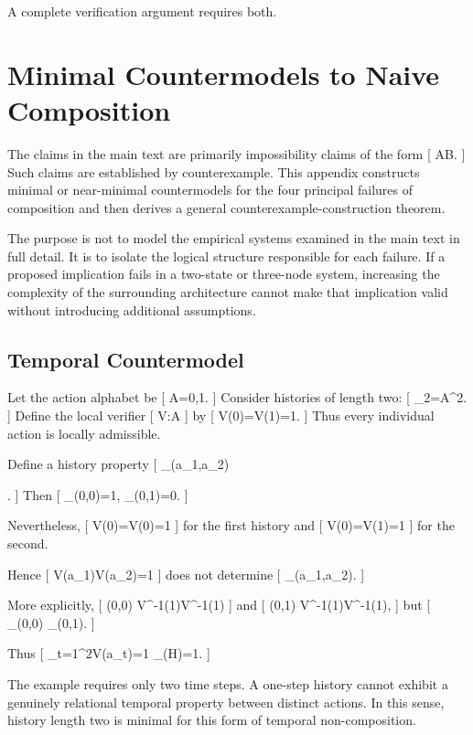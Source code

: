 \documentclass[11pt]{article}
\newcommand{\Hist}{\mathcal{H}} \newcommand{\States}{\mathcal{S}} \newcommand{\Actions}{\mathcal{A}} \newcommand{\Obs}{\mathcal{O}} \newcommand{\Img}{\operatorname{Im}}
\begin{document}
A complete verification argument requires both.

\section{Minimal Countermodels to Naive Composition}
\label{app:countermodels}

The claims in the main text are primarily impossibility claims of the form
[
A\not\Rightarrow B.
]
Such claims are established by counterexample. This appendix constructs minimal or near-minimal countermodels for the four principal failures of composition and then derives a general counterexample-construction theorem.

The purpose is not to model the empirical systems examined in the main text in full detail. It is to isolate the logical structure responsible for each failure. If a proposed implication fails in a two-state or three-node system, increasing the complexity of the surrounding architecture cannot make that implication valid without introducing additional assumptions.

\subsection{Temporal Countermodel}

Let the action alphabet be
[
\mathcal A={0,1}.
]
Consider histories of length two:
[
\Hist_2=\mathcal A^2.
]
Define the local verifier
[
V:\mathcal A
]
by
[
V(0)=V(1)=1.
]
Thus every individual action is locally admissible.

Define a history property
[
\Phi_{}(a_1,a_2)

.
]
Then
[
\Phi_{}(0,0)=1,
\qquad
\Phi_{}(0,1)=0.
]

Nevertheless,
[
V(0)=V(0)=1
]
for the first history and
[
V(0)=V(1)=1
]
for the second.

Hence
[
V(a_1)\land V(a_2)=1
]
does not determine
[
\Phi_{}(a_1,a_2).
]

More explicitly,
[
(0,0)
\in
V^{-1}(1)\times V^{-1}(1)
]
and
[
(0,1)
\in
V^{-1}(1)\times V^{-1}(1),
]
but
[
\Phi_{}(0,0)
\neq
\Phi_{}(0,1).
]

Thus
[
\bigwedge_{t=1}^{2}V(a_t)=1
\not\Rightarrow
\Phi_{}(H)=1.
]

The example requires only two time steps. A one-step history cannot exhibit a genuinely relational temporal property between distinct actions. In this sense, history length two is minimal for this form of temporal non-composition.
\end{document}
